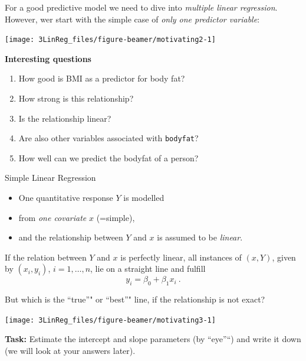 \documentclass[10pt,ignorenonframetext,]{beamer}
\providecommand{\tightlist}{%
  \setlength{\itemsep}{0pt}\setlength{\parskip}{0pt}}
\begin{document}
\begin{frame}

For a good predictive model we need to dive into \emph{multiple linear
regression}. However, wer start with the simple case of \emph{only one
predictor variable}:

\begin{center}\texttt{[image: 3LinReg\_files/figure-beamer/motivating2-1]} \end{center}

\end{frame}

\begin{frame}[fragile]

\textbf{Interesting questions}

\begin{enumerate}
\def\labelenumi{\arabic{enumi}.}
\tightlist
\item
  How good is BMI as a predictor for body fat?
\item
  How strong is this relationship?
\item
  Is the relationship linear?
\item
  Are also other variables associated with \texttt{bodyfat}?
\item
  How well can we predict the bodyfat of a person?
\end{enumerate}

\end{frame}

\begin{frame}{Simple Linear Regression}

\begin{itemize}
\item
  One quantitative response \(Y\) is modelled
\item
  from \emph{one covariate} \(x\) (=simple),
\item
  and the relationship between \(Y\) and \(x\) is assumed to be
  \emph{linear}.
\end{itemize}

\vspace{6mm} If the relation between \(Y\) and \(x\) is perfectly
linear, all instances of \((x,Y)\), given by \((x_i,y_i)\),
\(i= 1,\ldots, n\), lie on a straight line and fulfill
\[y_i = \beta_0 + \beta_1 x_i\ .\]

\end{frame}

\begin{frame}

But which is the ``true''" or ``best''" line, if the relationship is not
exact?

\begin{center}\texttt{[image: 3LinReg\_files/figure-beamer/motivating3-1]} \end{center}

\textbf{Task:} Estimate the intercept and slope parameters (by
``eye''``) and write it down (we will look at your answers later).

\end{frame}
\end{document}
